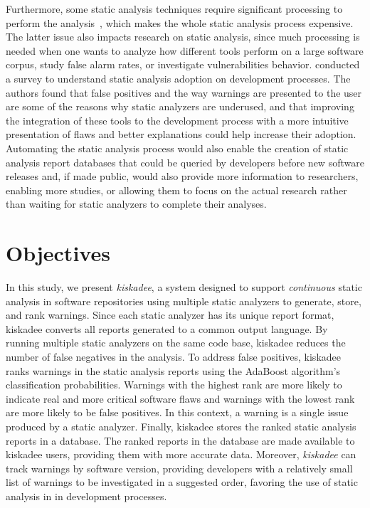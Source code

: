 Furthermore, some static analysis techniques require significant processing to
perform the analysis~\citep{pan_bug_2006}, which makes the whole static analysis
process expensive. The latter issue also impacts research on static analysis,
since much processing is needed when one wants to analyze how different tools
perform on a large software corpus, study false alarm rates, or investigate
vulnerabilities behavior. \cite{johnson_why_2013} conducted a
survey to understand static analysis adoption on development processes.
The authors found that false positives and the way warnings are presented to the user are
some of the reasons why static analyzers are underused, and that improving the
integration of these tools to the development process with a more intuitive
presentation of flaws and better explanations could help increase their
adoption.  Automating the static analysis process would also enable the
creation of static analysis report databases that could be queried by
developers before new software releases and, if made public, would also provide
more information to researchers, enabling more studies, or allowing them to focus
on the actual research rather than waiting for static analyzers to complete
their analyses.


\section{Objectives}
\label{sec:objectives}

In this study, we present \textit{kiskadee}, a system designed to support
\emph{continuous} static analysis in software repositories using multiple
static analyzers to generate, store, and rank warnings. Since each static
analyzer has its unique report format, kiskadee converts all reports generated to
a common output language. By running multiple static analyzers on the same code
base, kiskadee reduces the number of false negatives in the analysis. To
address false positives, kiskadee ranks warnings in the static analysis reports
using the AdaBoost algorithm's~\citep{freund1999short} classification
probabilities.  Warnings with the highest rank are more likely to indicate real
and more critical software flaws and warnings with the lowest rank are more
likely to be false positives. In this context, a warning is a single issue
produced by a static analyzer. Finally, kiskadee stores the ranked static
analysis reports in a database. The ranked reports in the database are made
available to kiskadee users, providing them with more accurate data. Moreover,
\textit{kiskadee} can track warnings by software version, providing developers
with a relatively small list of warnings to be investigated in a suggested
order, favoring the use of static analysis in in development processes.

